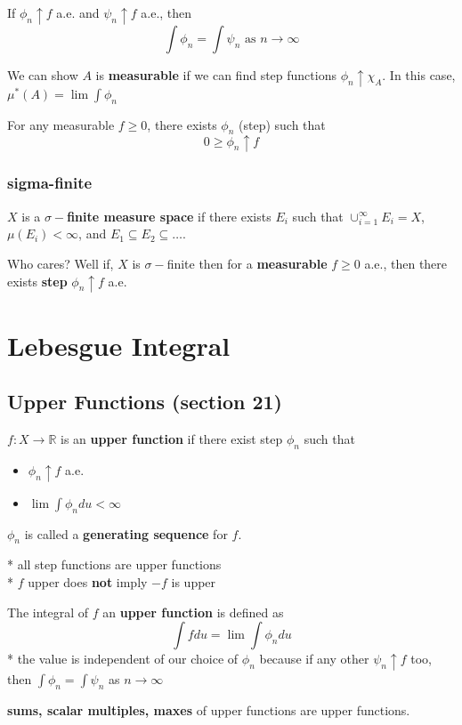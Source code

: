 \documentclass[a4paper, 12pt]{article}
\def\R{\ensuremath{\mathbb{R}}} %
\newcommand{\bt}[1]{\textbf{#1}} %
\begin{document}
\begin{multicols}{2}
    If $\phi_n \uparrow f$ a.e. and $\psi_n \uparrow f$ a.e., then 
    $$\int \phi_n = \int \psi_n \text{ as } n \rightarrow \infty$$

    We can show $A$ is \bt{measurable} if we can find 
    step functions $\phi_n \uparrow \chi_A$. 
    In this case, $\mu^*(A) = \lim \int \phi_n$

    For any measurable $f \geq 0$, there exists $\phi_n$ (step) such that 
    $$ 0 \geq \phi_n \uparrow f$$

    \subsubsection{sigma-finite}
    $X$ is a \bt{$\sigma-$finite measure space} if there exists 
    $E_i$ such that $\cup_{i=1}^\infty E_i = X$, $\mu(E_i) < \infty$, 
    and $E_1 \subseteq E_2 \subseteq \dots$.

    Who cares? Well if, $X$ is $\sigma-$finite then 
    for a \bt{measurable} $f \geq 0$ a.e., then there exists 
    \bt{step} $\phi_n \uparrow f$ a.e.

\section{Lebesgue Integral}


\subsection{Upper Functions (section 21)}

$f: X \rightarrow \R$  is an \bt{upper function} if there exist step $\phi_n$ such that  
\begin{itemize}
    \item $\phi_n \uparrow f$ a.e.
    \item $\lim \int \phi_n du < \infty$
\end{itemize}

$\phi_n$ is called a \bt{generating sequence} for $f$.

* all step functions are upper functions\\
* $f$ upper does \bt{not} imply $-f$ is upper

The integral of $f$ an \bt{upper function} is defined as 
$$\int f du = \lim \int \phi_n du$$
* the value is independent of our choice of $\phi_n$ because if any other 
$\psi_n \uparrow f$ too, then $\int \phi_n = \int \psi_n$ as $n \rightarrow \infty$


\bt{sums, scalar multiples, maxes} of upper functions are upper functions.



\end{multicols}
\end{document}

